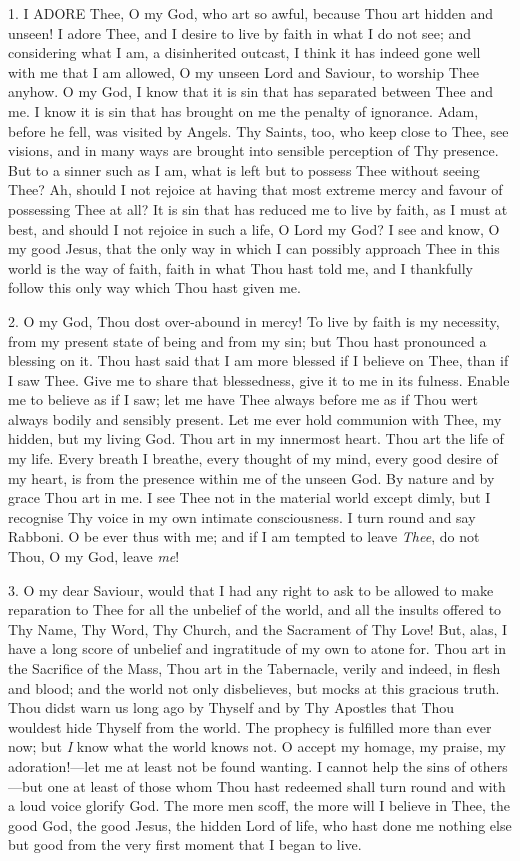 1. I ADORE
Thee, O my God, who art so awful, because Thou art hidden and unseen! I
adore Thee, and I desire to live by faith in what I do not see; and
considering what I am, a disinherited outcast, I think it has indeed
gone well with me that I am allowed, O my unseen Lord and Saviour, to
worship Thee anyhow. O my God, I know that it is sin that has separated
between Thee and me. I know it is sin that has brought on me the penalty
of ignorance. Adam, before he fell, was visited by Angels. Thy Saints,
too, who keep close to Thee, see visions, and in many ways are brought
into sensible perception of Thy presence. But to a sinner such as I am,
what is left but to possess Thee without seeing Thee? Ah, should I not
rejoice at having that most extreme mercy and favour of possessing Thee
at all? It is sin that has reduced me to live by faith, as I must at
best, and should I not rejoice in such a life, O Lord my God? I
see and know, O my good Jesus, that the only way in which I can possibly
approach Thee in this world is the way of faith, faith in what Thou hast
told me, and I thankfully follow this only way which Thou hast given me.

2. O my God, Thou dost
over-abound in mercy! To live by faith is my necessity, from my present
state of being and from my sin; but Thou hast pronounced a blessing on
it. Thou hast said that I am more blessed if I believe on Thee, than if
I saw Thee. Give me to share that blessedness, give it to me in its
fulness. Enable me to believe as if I saw; let me have Thee always
before me as if Thou wert always bodily and sensibly present. Let me
ever hold communion with Thee, my hidden, but my living God. Thou art in
my innermost heart. Thou art the life of my life. Every breath I
breathe, every thought of my mind, every good desire of my heart, is
from the presence within me of the unseen God. By nature and by grace
Thou art in me. I see Thee not in the material world except dimly, but I
recognise Thy voice in my own intimate consciousness. I turn round and
say Rabboni. O be ever thus with me; and if I am tempted to leave \emph{Thee},
do not Thou, O my God, leave \emph{me}!

3. O my dear Saviour, would that
I had any right to ask to be allowed to make reparation to Thee for all
the unbelief of the world, and all the insults offered to Thy Name, Thy
Word, Thy Church, and the Sacrament of Thy Love! But, alas, I have a
long score of unbelief and ingratitude of my own to atone for.
Thou art in the Sacrifice of the Mass, Thou art in the Tabernacle,
verily and indeed, in flesh and blood; and the world not only
disbelieves, but mocks at this gracious truth. Thou didst warn us long
ago by Thyself and by Thy Apostles that Thou wouldest hide Thyself from
the world. The prophecy is fulfilled more than ever now; but \emph{I}
know what the world knows not. O accept my homage, my praise, my
adoration!—let me at least not be found wanting. I cannot help the
sins of others—but one at least of those whom Thou hast redeemed shall
turn round and with a loud voice glorify God. The more men scoff, the
more will I believe in Thee, the good God, the good Jesus, the hidden
Lord of life, who hast done me nothing else but good from the very first
moment that I began to live.

